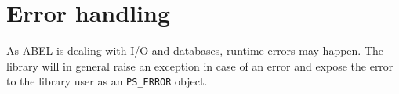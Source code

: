 \documentclass[a4paper,12pt]{report}
\begin{document}
% 
% 

\chapter{Error handling}

As ABEL is dealing with I/O and databases, runtime errors may happen. 
The library will in general raise an exception in case of an error and expose the error to the library user as an \lstinline!PS_ERROR! object.
% 
% 
% 
\end{document}
